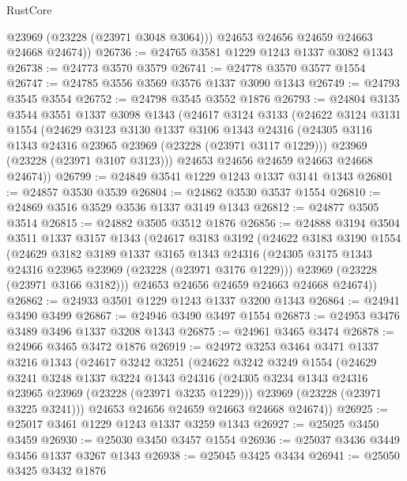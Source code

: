 \begin{lexlean}{RustCore}
\begin{coremodule}
          @23969
          (@23228 (@23971 @3048 @3064)))
        @24653
        @24656
        @24659
        @24663
        @24668
        @24674))
@26736 := @24765 @3581 @1229 @1243 @1337 @3082 @1343
@26738 := @24773 @3570 @3579
@26741 := @24778 @3570 @3577 @1554
@26747 := @24785 @3556 @3569 @3576 @1337 @3090 @1343
@26749 := @24793 @3545 @3554
@26752 := @24798 @3545 @3552 @1876
@26793 := @24804
    @3135
    @3544
    @3551
    @1337
    @3098
    @1343
    (@24617
      @3124
      @3133
      (@24622
        @3124
        @3131
        @1554
        (@24629
          @3123
          @3130
          @1337
          @3106
          @1343
          @24316
          (@24305 @3116 @1343 @24316 @23965 @23969 (@23228 (@23971 @3117 @1229)))
          @23969
          (@23228 (@23971 @3107 @3123)))
        @24653
        @24656
        @24659
        @24663
        @24668
        @24674))
@26799 := @24849 @3541 @1229 @1243 @1337 @3141 @1343
@26801 := @24857 @3530 @3539
@26804 := @24862 @3530 @3537 @1554
@26810 := @24869 @3516 @3529 @3536 @1337 @3149 @1343
@26812 := @24877 @3505 @3514
@26815 := @24882 @3505 @3512 @1876
@26856 := @24888
    @3194
    @3504
    @3511
    @1337
    @3157
    @1343
    (@24617
      @3183
      @3192
      (@24622
        @3183
        @3190
        @1554
        (@24629
          @3182
          @3189
          @1337
          @3165
          @1343
          @24316
          (@24305 @3175 @1343 @24316 @23965 @23969 (@23228 (@23971 @3176 @1229)))
          @23969
          (@23228 (@23971 @3166 @3182)))
        @24653
        @24656
        @24659
        @24663
        @24668
        @24674))
@26862 := @24933 @3501 @1229 @1243 @1337 @3200 @1343
@26864 := @24941 @3490 @3499
@26867 := @24946 @3490 @3497 @1554
@26873 := @24953 @3476 @3489 @3496 @1337 @3208 @1343
@26875 := @24961 @3465 @3474
@26878 := @24966 @3465 @3472 @1876
@26919 := @24972
    @3253
    @3464
    @3471
    @1337
    @3216
    @1343
    (@24617
      @3242
      @3251
      (@24622
        @3242
        @3249
        @1554
        (@24629
          @3241
          @3248
          @1337
          @3224
          @1343
          @24316
          (@24305 @3234 @1343 @24316 @23965 @23969 (@23228 (@23971 @3235 @1229)))
          @23969
          (@23228 (@23971 @3225 @3241)))
        @24653
        @24656
        @24659
        @24663
        @24668
        @24674))
@26925 := @25017 @3461 @1229 @1243 @1337 @3259 @1343
@26927 := @25025 @3450 @3459
@26930 := @25030 @3450 @3457 @1554
@26936 := @25037 @3436 @3449 @3456 @1337 @3267 @1343
@26938 := @25045 @3425 @3434
@26941 := @25050 @3425 @3432 @1876

\end{coremodule}
\end{lexlean}
